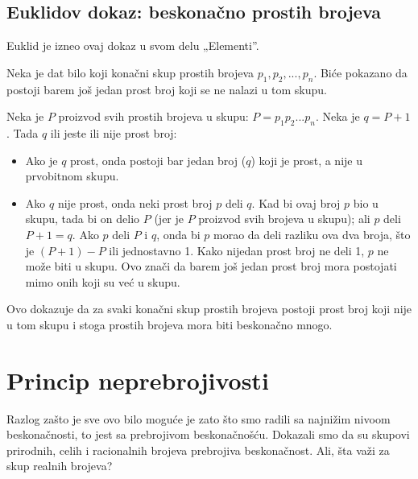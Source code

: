 \documentclass[a4paper]{article}
\begin{document}
\subsection{Euklidov dokaz: beskonačno prostih brojeva}
Euklid je izneo ovaj dokaz u svom delu „Elementi”\cite{williamson1788elements}.

Neka je dat bilo koji konačni skup prostih brojeva $p_{1}, p_{2}, ..., p_{n}$. Biće pokazano da postoji barem još jedan prost broj koji se ne nalazi u tom skupu.

Neka je $P$ proizvod svih prostih brojeva u skupu: $P = p_{1}p_{2}...p_{n}$. Neka je $q = P + 1$. Tada $q$ ili jeste ili nije prost broj:
\begin{itemize}
\item Ako je $q$ prost, onda postoji bar jedan broj ($q$) koji je prost, a nije u prvobitnom skupu.
\item Ako $q$ nije prost, onda neki prost broj $p$ deli $q$. Kad bi ovaj broj $p$ bio u skupu, tada bi on delio $P$ (jer je $P$ proizvod svih brojeva u skupu); ali $p$ deli $P + 1 = q$. Ako $p$ deli $P$ i $q$, onda bi $p$ morao da deli razliku
\cite{objasnjenje_deljenja} ova dva broja, što je $(P + 1) - P$ ili jednostavno 1. Kako nijedan prost broj ne deli 1, $p$ ne može biti u skupu. Ovo znači da barem još jedan prost broj mora postojati mimo onih koji su već u skupu.
\end{itemize} 

Ovo dokazuje da za svaki konačni skup prostih brojeva postoji prost broj koji nije u tom skupu i stoga prostih brojeva mora biti beskonačno mnogo.

\section{Princip neprebrojivosti}
Razlog zašto je sve ovo bilo moguće je zato što smo radili sa najnižim nivoom beskonačnosti, to jest sa prebrojivom beskonačnošću. Dokazali smo da su skupovi prirodnih, celih i racionalnih brojeva prebrojiva beskonačnost. Ali, šta važi za skup realnih brojeva? 
\end{document}
